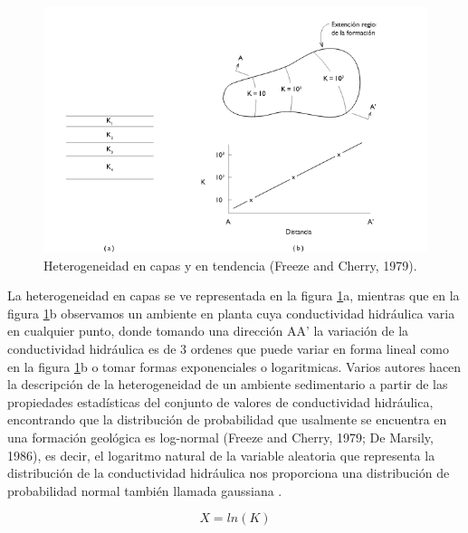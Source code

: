 \begin{figure}[ht!]
\centering
\includegraphics[scale=0.60]{Figura3.png}
\caption{Heterogeneidad en capas y en tendencia (Freeze and Cherry, 1979).}
\label{Figura2:1.3}
\end{figure}
La heterogeneidad en capas se ve representada en la figura \ref{Figura2:1.3}a, mientras que en la figura \ref{Figura2:1.3}b observamos un ambiente en planta cuya conductividad hidráulica varia en cualquier punto, donde tomando una dirección AA' la variación de la conductividad hidráulica es de 3 ordenes que puede variar en forma lineal como en la figura \ref{Figura2:1.3}b o tomar formas exponenciales o logaritmicas. Varios autores hacen la descripción de la heterogeneidad de un ambiente sedimentario a partir de las propiedades estadísticas del conjunto de valores de conductividad hidráulica, encontrando que la distribución de probabilidad que usalmente se encuentra en una formación geológica es log-normal (Freeze and Cherry, 1979; De Marsily, 1986), es decir, el logaritmo natural de la variable aleatoria que representa la distribución de la conductividad hidráulica nos proporciona una distribución de probabilidad normal también llamada gaussiana \cite{Freeze1979}\cite{Marsily1986}.

\begin{equation}
\label{eqn:phi12}
X=ln(K)
\end{equation}

